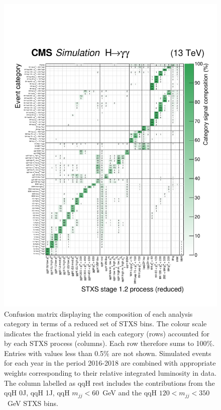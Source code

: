 \begin{figure}[hptb]
  \centering
  \includegraphics[width=1\textwidth]{Figures/hgg_overview/purityMatrix_UL_final.pdf}
  \caption[Confusion matrix for the full set of analysis categories]
  {
    Confusion matrix displaying the composition of each analysis category in terms of a reduced set of STXS bins. The colour scale indicates the fractional yield in each category (rows) accounted for by each STXS process (columns). Each row therefore sums to 100\%. Entries with values less than 0.5\% are not shown. Simulated events for each year in the period 2016-2018 are combined with appropriate weights corresponding to their relative integrated luminosity in data. The column labelled as qqH rest includes the contributions from the qqH 0J, qqH 1J, qqH $m_{jj}<60$~GeV and the qqH $120<m_{jj}<350$~GeV STXS bins.
  }
  \label{fig:purity_matrix}
\end{figure}




